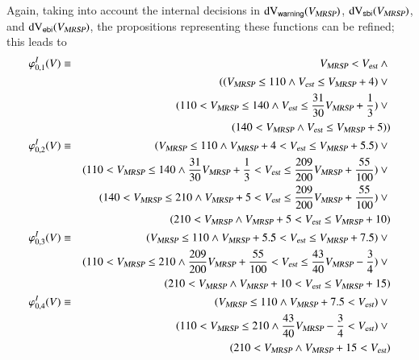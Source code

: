 Again, taking into account the internal decisions in 
$\dvw(\vmax)$, $\dvs(\vmax)$, and $\dve(\vmax)$,
the propositions representing these functions can be refined; this leads to
\footnotesize
\begin{eqnarray*}
\varphi_{0,1}^I(V) &\equiv& \vmax < \vest \wedge {}
\\ & & ((\vmax \le 110 \wedge   \vest \le \vmax +4) \vee {}
\\ & & \ \ (110<\vmax \le 140  \wedge \vest \le \frac{31}{30}\vmax +\frac{1}{3} ) \vee {}
\\ & & \ \ (140<\vmax \wedge  \vest \le \vmax +5))
\\
\varphi_{0,2}^I(V) &\equiv& (\vmax \le 110 \wedge \vmax +4 < \vest \le \vmax + 5.5 )
\vee {}
\\ & &  (110 <\vmax  \le 140 \wedge \frac{31}{30}\vmax +\frac{1}{3} < \vest \le\frac{209}{200}\vmax +\frac{55}{100}) \vee {}
\\ & &  (140 < \vmax \le 210 \wedge \vmax +5 < \vest \le\frac{209}{200}\vmax +\frac{55}{100}) \vee {}
\\ & &  (210 < \vmax  \wedge  \vmax +5 < \vest \le\vmax + 10) 
\\
\varphi_{0,3}^I(V) & \equiv &  (\vmax \le 110 \wedge \vmax + 5.5 < \vest \le  \vmax + 7.5) \vee {}
\\ & & (110<\vmax \le 210 \wedge \frac{209}{200}\vmax +\frac{55}{100}< \vest \le  \frac{43}{40}\vmax -\frac{3}{4}) \vee {}
\\ & & (210<\vmax   \wedge \vmax +10 < \vest \le  \vmax +15)
\\
\varphi_{0,4}^I(V) &\equiv& (\vmax \le 110 \wedge \vmax + 7.5 < \vest ) \vee {}
\\ & & (110<\vmax \le 210 \wedge  \frac{43}{40}\vmax -\frac{3}{4}< \vest ) \vee {}
\\ & & (210<\vmax   \wedge \vmax +15 < \vest )  
\end{eqnarray*}
\normalsize

